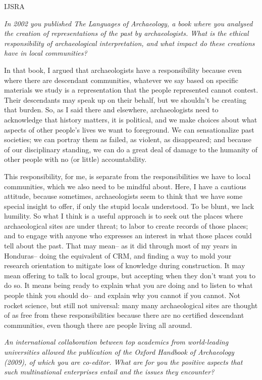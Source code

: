 \begin{labeling}{IJSRA}
\item[IJSRA] \textit{In 2002 you published \emph{The Languages of Archaeology}, a book where you analysed the creation of representations of the past by archaeologists. What is the ethical responsibility of archaeological interpretation, and what impact do these creations have in local communities?} 


\item[RAJ] In that book, I argued that archaeologists have a responsibility because even where there are descendant communities, whatever we say based on specific materials we study is a representation that the people represented cannot contest. Their descendants may speak up on their behalf, but we shouldn't be creating that burden. So, as I said there and elsewhere, archaeologists need to acknowledge that history matters, it is political, and we make choices about what aspects of other people's lives we want to foreground. We can sensationalize past societies; we can portray them as failed, as violent, as disappeared; and because of our disciplinary standing, we can do a great deal of damage to the humanity of other people with no (or little) accountability.

This responsibility, for me, is separate from the responsibilities we have to local communities, which we also need to be mindful about. Here, I have a cautious attitude, because sometimes, archaeologists seem to think that we have some special insight to offer, if only the stupid locals understood. To be blunt, we lack humility. So what I think is a useful approach is to seek out the places where archaeological sites are under threat; to labor to create records of those places; and to engage with anyone who expresses an interest in what those places could tell about the past. That may mean-- as it did through most of my years in Honduras-- doing the equivalent of CRM, and finding a way to mold your research orientation to mitigate loss of knowledge during construction. It may mean offering to talk to local groups, but accepting when they don't want you to do so. It means being ready to explain what you are doing and to listen to what people think you should do-- and explain why you cannot if you cannot. Not rocket science, but still not universal: many many archaeological sites are thought of as free from these responsibilities because there are no certified descendant communities, even though there are people living all around.

\item[IJSRA] \emph{An international collaboration between top academics from world-leading universities allowed the publication of the \emph{Oxford Handbook of Archaeology} (2009), of which you are co-editor. What are for you the positive aspects that such multinational enterprises entail and the issues they encounter?}


\end{labeling}
